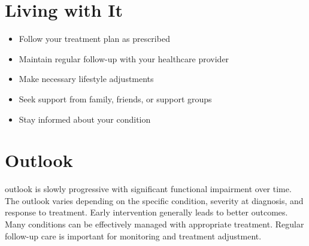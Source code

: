 \section{Living with It}
\begin{itemize}[noitemsep]
  \item Follow your treatment plan as prescribed
  \item Maintain regular follow-up with your healthcare provider
  \item Make necessary lifestyle adjustments
  \item Seek support from family, friends, or support groups
  \item Stay informed about your condition
\end{itemize}
\section{Outlook}
outlook is slowly progressive with significant functional impairment over time. The outlook varies depending on the specific condition, severity at diagnosis, and response to treatment. Early intervention generally leads to better outcomes. Many conditions can be effectively managed with appropriate treatment. Regular follow-up care is important for monitoring and treatment adjustment.
